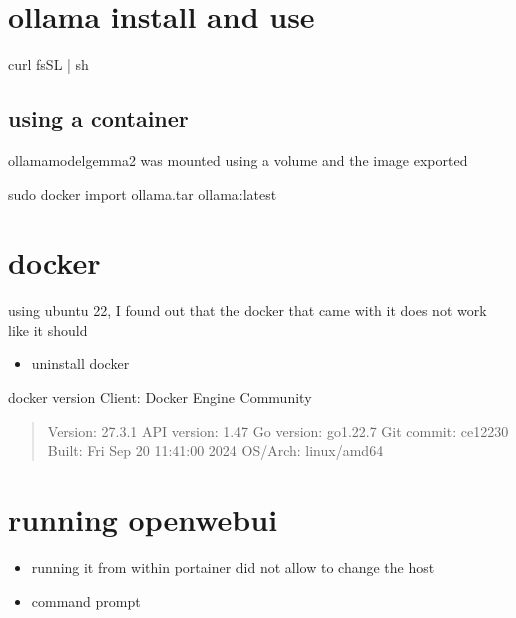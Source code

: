 \documentclass[letterpaper,10pt,english]{sphinxmanual}
\begin{document}
\sphinxstepscope


\chapter{ollama install and use}
\label{\detokenize{ollama:ollama-install-and-use}}\label{\detokenize{ollama::doc}}
\sphinxAtStartPar
curl \sphinxhyphen{}fsSL  | sh


\section{using a container}
\label{\detokenize{ollama:using-a-container}}
\sphinxAtStartPar
ollama\sphinxhyphen{}model\sphinxhyphen{}gemma2 was mounted using a volume and the image exported

\sphinxAtStartPar
sudo docker import ollama.tar ollama:latest

\sphinxstepscope


\chapter{docker}
\label{\detokenize{docker:docker}}\label{\detokenize{docker::doc}}
\sphinxAtStartPar
using ubuntu 22, I found out that the docker that came with it does not work like it should
\begin{itemize}
\item {} 
\sphinxAtStartPar
uninstall docker

\end{itemize}

\sphinxAtStartPar
docker version
Client: Docker Engine \sphinxhyphen{} Community
\begin{quote}

\sphinxAtStartPar
Version:           27.3.1
API version:       1.47
Go version:        go1.22.7
Git commit:        ce12230
Built:             Fri Sep 20 11:41:00 2024
OS/Arch:           linux/amd64
\end{quote}


\chapter{running openwebui}
\label{\detokenize{docker:running-openwebui}}\begin{itemize}
\item {} 
\sphinxAtStartPar
running it from within portainer did not allow to change the host

\item {} 
\sphinxAtStartPar
command prompt

\end{itemize}
\end{document}
